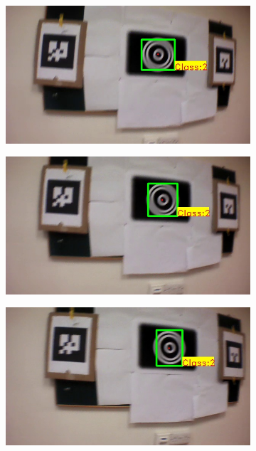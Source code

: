 \documentclass[10pt,twocolumn,letterpaper]{article}
\begin{document}
\begin{figure}
\begin{subfigure}[b]{.19\textwidth}
\end{subfigure}
\begin{subfigure}[b]{.19\textwidth}
\includegraphics[width=\linewidth]{BLUT_input_10/output2.jpg}
\end{subfigure}
\begin{subfigure}[b]{.19\textwidth}
\includegraphics[width=\linewidth]{BLUT_input_10/output3.jpg}
\end{subfigure}
\begin{subfigure}[b]{.19\textwidth}
\includegraphics[width=\linewidth]{BLUT_input_10/output4.jpg}

\end{subfigure}
\end{figure}
\end{document}

